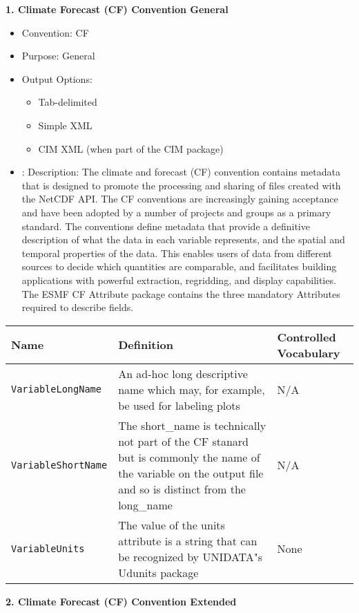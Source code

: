 \vspace{.20in}
{\bf 1. Climate Forecast (CF) Convention General}

\begin{itemize}
    \item Convention: CF
    \item Purpose: General
    \item Output Options:
    \begin{itemize}
        \item Tab-delimited
        \item Simple XML
        \item CIM XML (when part of the CIM package)
    \end{itemize} 
    \item: Description: The climate and forecast (CF) convention contains metadata that is designed to promote the processing and sharing of files created with the NetCDF API. The CF conventions are increasingly gaining acceptance and have been adopted by a number of projects and groups as a primary standard. The conventions define metadata that provide a definitive description of what the data in each variable represents, and the spatial and temporal properties of the data. This enables users of data from different sources to decide which quantities are comparable, and facilitates building applications with powerful extraction, regridding, and display capabilities. The ESMF CF Attribute package contains the three mandatory Attributes required to describe fields.  
\end{itemize}

\begin{tabular}{|p{8cm}|p{20cm}|p{10cm}|}
    {\bf Name } & {\bf Definition} & {\bf Controlled Vocabulary} \\
    \hline\hline
    {\tt VariableLongName} & An ad-hoc long descriptive name which may, for example, be used for labeling plots & N/A\\
    {\tt VariableShortName}  & The short\_name is technically not part of the CF stanard but is commonly the name of the variable on the output file and so is distinct from the long\_name & N/A \\
    {\tt VariableUnits}  & The value of the units attribute is a string that can be recognized by UNIDATA"s Udunits package & None\\
\end{tabular}




\vspace{.20in}
{\bf 2. Climate Forecast (CF) Convention Extended}

